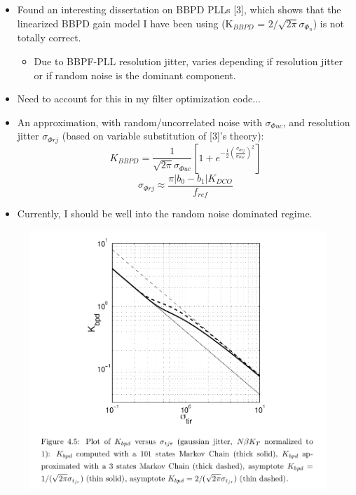 			\begin{itemize}[itemsep=4pt,label=\protect---]
				\item Found an interesting dissertation on BBPD PLLs [3], which shows that the linearized BBPD gain model I have been using (K$_{BBPD}$ = $2/\sqrt{2\pi}\sigma_{\Phi_n}$) is not totally correct. 
				\begin{itemize}[itemsep=4pt,label=\protect$\bullet$]
						\item Due to BBPF-PLL resolution jitter, varies depending if resolution jitter or if random noise is the dominant component.
				\end{itemize}
				\item Need to account for this in my filter optimization code...
				\item An approximation, with random/uncorrelated noise with $\sigma_{\Phi uc}$, and resolution jitter $\sigma_{\Phi{rj}}$ (based on variable substitution of [3]'s theory):
				\begin{equation}
					K_{BBPD} = \frac{1}{\sqrt{2\pi}\sigma_{\Phi uc}}\left[1+ e^{-\frac{1}{2}\left(\frac{\sigma_{\Phi{rj}}}{\sigma_{\Phi uc}}\right)^2} \right]
				\end{equation}
					\begin{equation}
						\sigma_{\Phi rj} \approx \frac{\pi|b_0-b_1|K_{DCO}}{f_{ref}}
					\end{equation}
				\item Currently, I should be well into the random noise dominated regime.
			\end{itemize}

	
			\begin{figure}[htb!]
			        \centering
			        \includegraphics[width=1\textwidth, angle=0]{./figs/kbbpd}
			\end{figure}

